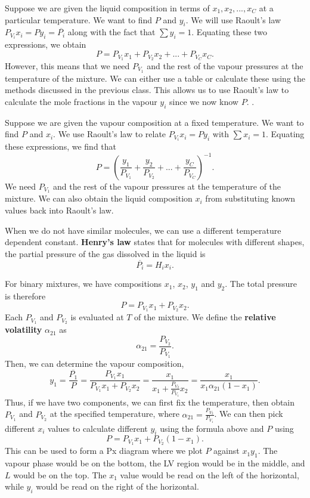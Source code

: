 \documentclass[11pt]{article}
\theoremstyle{plain} %
\theoremstyle{definition}
\theoremstyle{example}
\theoremstyle{remark}
\begin{document}
Suppose we are given the liquid composition in terms of $x_1, x_2, ..., x_C$ at a particular temperature. We want to find $P$ and $y_i$. We will use Raoult's law $P_{V_i}x_i = Py_i = \overline{P_i}$ along with the fact that
$\sum y_i = 1$. Equating these two expressions, we obtain 
$$P = P_{V_1}{x_1} + P_{V_2}{x_2} + ... + P_{V_C}{x_C}  .$$
However, this means that we need $P_{V_1}$ and the rest of the vapour pressures at the temperature of the mixture. We can either use a table or calculate these using the methods discussed in the previous class. This allows us to use Raoult's law to calculate the mole fractions in the vapour $y_i$ since we now know $P$. .

Suppose we are given the vapour composition at a fixed temperature. We want to find $P$ and $x_i$. We use Raoult's law to relate $P_{V_i}x_i = Py_i $ with $\sum x_i = 1$. Equating these expressions, we find that 
$$P = \left(\frac{y_1}{P_{V_1}} + \frac{y_2}{P_{V_2}} + ... + \frac{y_C}{P_{V_C}}\right)^{-1}.$$
We need $P_{V_1}$ and the rest of the vapour pressures at the temperature of the mixture. We can also obtain the liquid composition $x_i$ from substituting known values back into Raoult's law. 

When we do not have similar molecules, we can use a different temperature dependent constant. \textbf{Henry's law} states that for molecules with different shapes, the partial pressure of the gas dissolved in the liquid is $$\overline{P_i} = H_ix_i.$$

For binary mixtures, we have compositions $x_1$, $x_2$, $y_1$ and $y_2$. The total pressure is therefore 
$$P = P_{V_1}x_1 + P_{V_2}x_2.$$
Each $P_{V_1}$ and $P_{V_2}$ is evaluated at $T$ of the mixture. We define the \textbf{relative volatility} $\alpha_{21}$ as
$$\alpha_{21} = \frac{P_{V_2}}{P_{V_1}}.$$
Then, we can determine the vapour composition,
$$y_1 = \frac{\overline{P_1}}{P} = \frac{P_{V_1}x_1}{P_{V_1}x_1 + P_{V_2}x_2} = \frac{x_1}{x_1+ \frac{P_{V_2}}{P_{V_1}}x_2} = \frac{x_1}{x_1\alpha_{21}(1-x_1)}.$$
Thus, if we have two components, we can first fix the temperature, then obtain $P_{V_1}$ and $P_{V_2}$ at the specified temperature, where $\alpha_{21} = \frac{P_{V_2}}{P_{V_1}}$. We can then pick different $x_i$ values to calculate different $y_i$ using the formula above and $P$ using 
$$P = P_{V_1}x_1 + P_{V_2}(1-x_1).$$ This can be used to form a Px diagram where we plot $P$ against $x_1y_1$. The vapour phase would be on the bottom, the LV region would be in the middle, and $L$ would be on the top. The $x_1$ value would be read on the left of the horizontal, while $y_i$ would be read on the right of the horizontal. 
\end{document}
